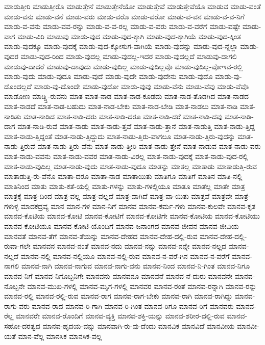 {ಮಾಡುತ್ತೀರಿ
ಮಾಡುತ್ತೀರೊ
ಮಾಡುತ್ತೇನೆ
ಮಾಡುತ್ತೇನೆಯೋ
ಮಾಡುತ್ತೇವೆ
ಮಾಡುತ್ತೇವೆಯೊ
ಮಾಡುವ
ಮಾಡು-ವಂತೆ
ಮಾಡು-ವನು
ಮಾಡು-ವನೆ
ಮಾಡು-ವರು
ಮಾಡು-ವರೊ
ಮಾಡು-ವರೋ
ಮಾಡು-ವ-ವನ
ಮಾಡು-ವ-ವ-ನಿಗೆ
ಮಾಡು-ವ-ವನು
ಮಾಡು-ವವ-ರನ್ನು
ಮಾಡು-ವ-ವ-ರಲ್ಲ
ಮಾಡು-ವ-ವರು
ಮಾಡು-ವ-ವರೆಗೆ
ಮಾಡು-ವಷ್ಟೇ
ಮಾಡು-ವಾಗ
ಮಾಡು-ವಿರಿ
ಮಾಡುವು
ಮಾಡು-ವುದ
ಮಾಡು-ವುದ-ಕ್ಕಾಗಿ
ಮಾಡು-ವುದ-ಕ್ಕಾಗಿಯೆ
ಮಾಡು-ವುದ-ಕ್ಕಿಂತ
ಮಾಡು-ವುದಕ್ಕೂ
ಮಾಡು-ವುದಕ್ಕೆ
ಮಾಡು-ವುದ-ಕ್ಕೋಸುಗ-ವಾಗಿಯೆ
ಮಾಡು-ವುದನ್ನು
ಮಾಡು-ವುದ-ನ್ನೆಲ್ಲಾ
ಮಾಡು-ವುದರ
ಮಾಡು-ವುದ-ರಿಂದ
ಮಾಡು-ವುದಲ್ಲ
ಮಾಡು-ವುದಲ್ಲ-ಇದರ
ಮಾಡು-ವುದಲ್ಲದೆ
ಮಾಡುವು-ದಾಗಲಿ
ಮಾಡುವು-ದಾದರೆ
ಮಾಡುವು-ದಾವುದು
ಮಾಡು-ವುದಿಲ್ಲ
ಮಾಡು-ವುದಿಲ್ಲವೊ
ಮಾಡು-ವುದಿಲ್ಲ-ವೋಇವ-ರಲ್ಲಿ
ಮಾಡು-ವುದು
ಮಾಡು-ವುದೂ
ಮಾಡು-ವುದೆ
ಮಾಡು-ವುದೇ
ಮಾಡು-ವುದೇನು
ಮಾಡು-ವುದೊ
ಮಾಡು-ವು-ದೊಂದಲ್ಲದೆ
ಮಾಡು-ವು-ದೊಂದೇ
ಮಾಡು-ವುದೋ
ಮಾಡು-ವುವು
ಮಾಡು-ವೆನು
ಮಾಡು-ವೆವು
ಮಾಡು-ವೆವೊ
ಮಾಡೋಣ
ಮಾಡ್ಡ್ತಿ-ರುವನು
ಮಾತ
ಮಾತ-ನಾಡ
ಮಾತ-ನಾಡ-ಕೂಡದು
ಮಾತ-ನಾಡ-ತೊಡಗಿದ
ಮಾತ-ನಾಡದ
ಮಾತ-ನಾಡದೆ
ಮಾತ-ನಾಡ-ಬಹುದು
ಮಾತ-ನಾಡ-ಬೇಕು
ಮಾತ-ನಾಡ-ಬೇಡಿ
ಮಾತ-ನಾಡಲು
ಮಾತ-ನಾಡಿ
ಮಾತ-ನಾಡಿತು
ಮಾತ-ನಾಡಿದ
ಮಾತ-ನಾಡಿ-ದರು
ಮಾತ-ನಾಡಿ-ದರೂ
ಮಾತ-ನಾಡಿ-ದರೆ
ಮಾತ-ನಾಡಿ-ದವು
ಮಾತ-ನಾಡಿ-ದಾಗ
ಮಾತ-ನಾಡಿ-ರುವೆ
ಮಾತ-ನಾಡು
ಮಾತ-ನಾಡು-ತ್ತವೆ
ಮಾತ-ನಾಡು-ತ್ತಾನೆ
ಮಾತ-ನಾಡುತ್ತಿ
ಮಾತ-ನಾಡು-ತ್ತಿದ್ದ
ಮಾತ-ನಾಡು-ತ್ತಿದ್ದಂತೆ
ಮಾತ-ನಾಡು-ತ್ತಿದ್ದುದು
ಮಾತ-ನಾಡು-ತ್ತಿರು-ವಾಗಲೂ
ಮಾತ-ನಾಡು-ತ್ತಿರು-ವುದನ್ನು
ಮಾತ-ನಾಡು-ತ್ತಿರುವೆ
ಮಾತ-ನಾಡು-ತ್ತಿರು-ವೆನು
ಮಾತ-ನಾಡು-ತ್ತೀರಿ
ಮಾತ-ನಾಡು-ತ್ತೇನೆ
ಮಾತ-ನಾಡುವ
ಮಾತ-ನಾಡು-ವರು
ಮಾತ-ನಾಡು-ವವನು
ಮಾತ-ನಾಡು-ವವರ
ಮಾತ-ನಾಡು-ವಿರಲ್ಲ
ಮಾತ-ನಾಡು-ವುದಕ್ಕೆ
ಮಾತ-ನಾಡು-ವುದ-ರಲ್ಲಿ
ಮಾತ-ನಾಡು-ವುದಿಲ್ಲ
ಮಾತ-ನಾಡು-ವುದು
ಮಾತ-ನಾಡು-ವುದೂ
ಮಾತನ್ನು
ಮಾತಲ್ಲ
ಮಾತಾಡು
ಮಾತಾಡುತ್ತಿ-ರುವ
ಮಾತಾಡುತ್ತಿ-ರು-ವೆನೊ
ಮಾತಾ-ದರೂ
ಮಾತಾ-ನಾಡ
ಮಾತಾಯಿತು
ಮಾತಿಗೂ
ಮಾತಿಗೆ
ಮಾತಿನ
ಮಾತಿ-ನಲ್ಲಿ
ಮಾತಿನಿಂದ
ಮಾತು
ಮಾತು-ಕತೆ-ಯಲ್ಲಿ
ಮಾತು-ಗಳನ್ನು
ಮಾತು-ಗಳಲ್ಲಿಯೂ
ಮಾತೂ
ಮಾತೆಲ್ಲ
ಮಾತೇ
ಮಾತ್ರ
ಮಾತ್ರಕ್ಕೆ
ಮಾತ್ರ-ದಿಂದ
ಮಾತ್ರ-ವಲ್ಲ
ಮಾತ್ರ-ವಲ್ಲದೆ
ಮಾತ್ರ-ವಾಗಿದೆ
ಮಾತ್ರ-ವಾ-ಯಿತು
ಮಾತ್ರವೆ
ಮಾತ್ರವೇ
ಮಾತ್ರೆ-ಗಳುಳ್ಳ
ಮಾದಕದ್ರವ್ಯ
ಮಾನ
ಮಾನ-ಗಳ
ಮಾನ-ನಿಗೆ
ಮಾನವ
ಮಾನವ-ಕರ್ಮ-ಗಳು
ಮಾನವ-ಕುಲವೇ
ಮಾನವ-ಕೃತ
ಮಾನವ-ಕೊಟಿಯ
ಮಾನವ-ಕೋಟಿ
ಮಾನವ-ಕೋಟಿಗೆ
ಮಾನವ-ಕೋಟಿಗೇ
ಮಾನವ-ಕೋಟಿಯ
ಮಾನವ-ಕೋಟಿಯು
ಮಾನವ-ಕೋಟಿಯೂ
ಮಾನವ-ಕೋಟಿ-ಯೊಂದಿಗೆ
ಮಾನವ-ಜನಾಂಗದ
ಮಾನವ-ಜೀವನ
ಮಾನವ-ಜೀವಿಯ
ಮಾನವತೆ
ಮಾನವ-ತೆಗೆ
ಮಾನವ-ತೆಯನ್ನು
ಮಾನವ-ದೇಹದ
ಮಾನವ-ದೇಹ-ದಲ್ಲಿ-ರುವ
ಮಾನವ-ದೇಹ-ದಲ್ಲಿ-ರುವಾ-ಗಲೇ
ಮಾನವನ
ಮಾನವ-ನಂತೆ
ಮಾನವ-ನದು
ಮಾನವ-ನನ್ನು
ಮಾನವ-ನನ್ನೇ
ಮಾನವ-ನಲ್ಲದ
ಮಾನವ-ನಲ್ಲದೆ
ಮಾನವ-ನಲ್ಲಿ
ಮಾನವ-ನಲ್ಲಿಯೂ
ಮಾನವ-ನಲ್ಲಿ-ರುವ
ಮಾನವ-ನ-ವರೆ-ಗಿನ
ಮಾನವ-ನ-ವರೆಗೆ
ಮಾನವ-ನಾಗಲಿ
ಮಾನವ-ನಾಗಿ
ಮಾನವ-ನಾಗುವ
ಮಾನವ-ನಾಗು-ವನು
ಮಾನವ-ನಿಂದ
ಮಾನವ-ನಿ-ಗಿಂತ
ಮಾನವ-ನಿಗೂ
ಮಾನವ-ನಿಗೆ
ಮಾನವ-ನಿಗೊಬ್ಬನಿಗೇ
ಮಾನವನು
ಮಾನವನೂ
ಮಾನವನೆ
ಮಾನವ-ನೆ-ದುರು
ಮಾನವನೇ
ಮಾನವ-ನೊಬ್ಬನೇ
ಮಾನವ-ಮುಖ-ಗಳಲ್ಲಿ
ಮಾನವ-ಮೃಗ-ಗಳಲ್ಲಿ
ಮಾನವರ
ಮಾನವ-ರಂತೆ
ಮಾನವ-ರನ್ನಾಗಿ
ಮಾನವ-ರನ್ನು
ಮಾನವ-ರಲ್ಲಿ
ಮಾನವ-ರಲ್ಲಿ-ರುವ
ಮಾನವ-ರಾಗ
ಮಾನವ-ರಾಗ-ಬೇಕು
ಮಾನವ-ರಾಗಿ
ಮಾನವ-ರಾಗಿದ್ದು
ಮಾನವ-ರಾಗು-ವರು
ಮಾನವ-ರಾದ
ಮಾನವ-ರಿ-ಗಾಗಿ
ಮಾನವ-ರಿ-ಗಿಂತ
ಮಾನವ-ರಿಗೂ
ಮಾನವ-ರಿಗೆ
ಮಾನವರು
ಮಾನವ-ರೆಲ್ಲ
ಮಾನವರೇ
ಮಾನವ-ರೊಂದಿಗೆ
ಮಾನವ-ವ್ಯಕ್ತಿ
ಮಾನವ-ಶಕ್ತಿ-ಯನ್ನು
ಮಾನವ-ಶರೀರ-ದಲ್ಲಿ-ರುವ
ಮಾನವ-ಸಹೋ-ದರತ್ವದ
ಮಾನವ-ಹೃದಯ-ವನ್ನು
ಮಾನವಾಗಿ-ರು-ವು-ದೆಂದು
ಮಾನವಿಕ
ಮಾನವಿದೆ
ಮಾನವೀಯ
ಮಾನವೀ-ಯತೆ
ಮಾನ-ವೆಲ್ಲ
ಮಾನಸಿಕ
ಮಾನಸಿಕ-ವಲ್ಲ
}
